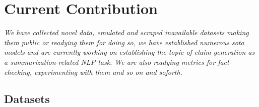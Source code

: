 
\chapter{Current Contribution}
\label{chap:contribution}

\textit{We have collected novel data, emulated and scraped inavailable datasets making them public or readying them for doing so, we have established numerous sota models and are currently working on establishing the topic of claim generation as a summarization-related NLP task.
We are also readying metrics for fact-checking, experimenting with them and so on and soforth.}

\section{Datasets}
\label{sec:datasets}
